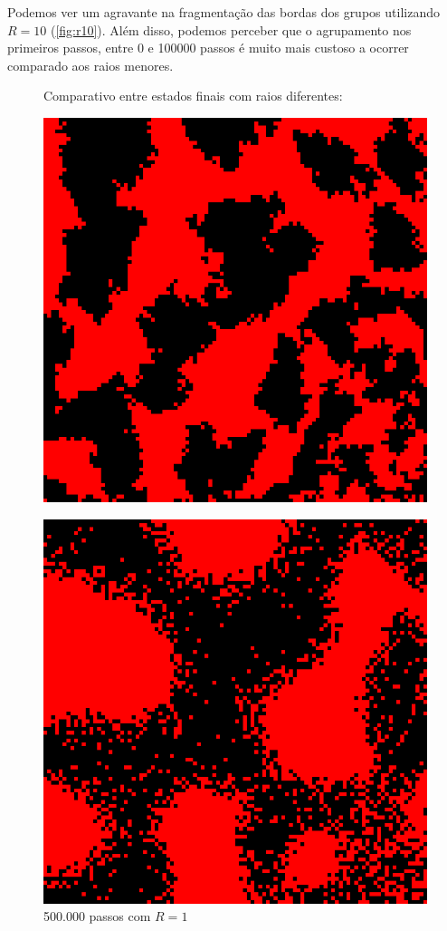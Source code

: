 \documentclass[conference]{IEEEtran}
\begin{document}
Podemos ver um agravante na fragmentação das bordas dos grupos utilizando $R=10$ (\ref{fig:r10}). Além disso, podemos perceber que o agrupamento nos primeiros passos, entre 0 e 100000 passos é muito mais custoso a ocorrer comparado aos raios menores.

\begin{figure}[h]
  Comparativo entre estados finais com raios diferentes:
  

  \begin{minipage}[b]{0.5\linewidth}
    \label{fig:comp}
    \centering
    \includegraphics[width=.8\linewidth]{resultados/1-6.png} 
    \caption{500.000 passos com $R=1$} 
    \vspace{4ex}
  \end{minipage}%
  \begin{minipage}[b]{0.5\linewidth}
    \centering
    \includegraphics[width=.8\linewidth]{resultados/5-6.png} 

\end{minipage}
\end{figure}
\end{document}
